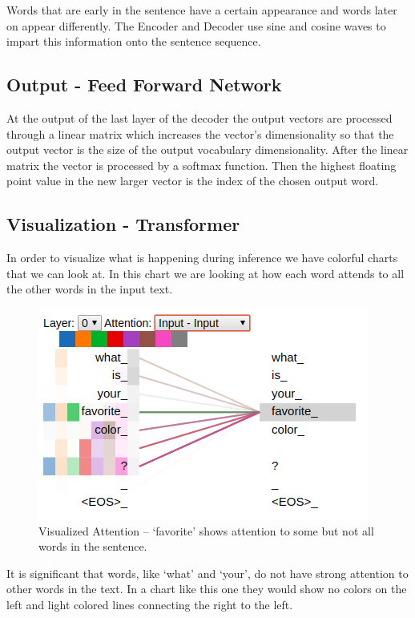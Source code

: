 Words that are early in the sentence have a certain appearance and words later on appear differently. The Encoder and Decoder use sine and cosine waves to impart this information onto the sentence sequence. 

\subsection{Output - Feed Forward Network}
At the output of the last layer of the decoder the output vectors are processed through a linear matrix which increases the vector's dimensionality so that the output vector is the size of the output vocabulary dimensionality. After the linear matrix the vector is processed by a softmax function. Then the highest floating point value in the new larger vector is the index of the chosen output word.


\subsection{Visualization - Transformer}

In order to visualize what is happening during inference we have colorful charts that we can look at. In this chart we are looking at how each word attends to all the other words in the input text.

\begin{figure}[H]
	\begin{center}
		\includegraphics[scale=2]{Figure_3}
		
		
	\end{center}
	\caption[Visualized Attention]{Visualized Attention -- `favorite' shows attention to some but not all words in the sentence.}
	
	
\end{figure}

It is significant that words, like `what' and `your', do not have strong attention to other words in the text. In a chart like this one they would show no colors on the left and light colored lines connecting the right to the left.

